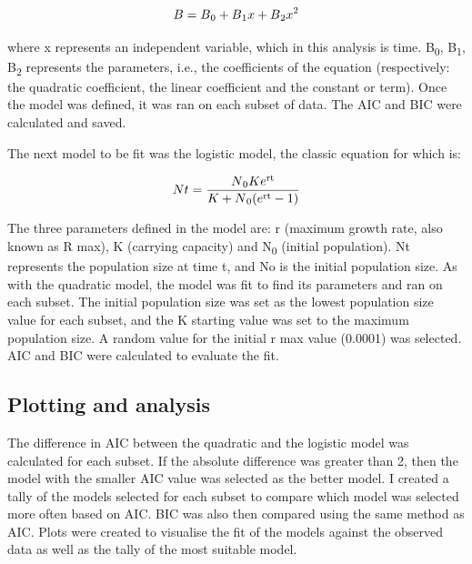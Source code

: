 \documentclass{article}[11pt]
\begin{document}
\begin{flushleft}
\[B = B\textsubscript{0}+B\textsubscript{1}x+B\textsubscript{2}x\textsuperscript{2}\]

where x represents an independent variable, which in this analysis is time. B\textsubscript{0}, B\textsubscript{1}, B\textsubscript{2} represents the parameters, i.e., the coefficients of the equation (respectively: the quadratic coefficient, the linear coefficient and the constant or term). Once the model was defined, it was ran on each subset of data. The AIC and BIC were calculated and saved.
\linebreak

The next model to be fit was the logistic model, the classic  equation for which is:

\[Nt = \frac{N\textsubscript{0} K e\textsuperscript{rt}}{K + N\textsubscript{0} (e\textsuperscript{rt} - 1)}\]

The three parameters defined in the model are: r (maximum growth rate, also known as R max), K (carrying capacity) and N\textsubscript{0} (initial population). Nt represents the population size at time t, and No is the initial population size. As with the quadratic model, the model was fit to find its parameters and ran on each subset. The initial population size was set as the lowest population size value for each subset, and the K starting value was set to the maximum population size. A random value for the initial r max value (0.0001) was selected. AIC and BIC were calculated to evaluate the fit.

\subsection{Plotting and analysis}

The difference in AIC between the quadratic and the logistic model was calculated for each subset. If the absolute difference was greater than 2, then the model with the smaller AIC value was selected as the better model. I created a tally of the models selected for each subset to compare which model was selected more often based on AIC. BIC was also then compared using the same method as AIC. Plots were created to visualise the fit of the models against the observed data as well as the tally of the most suitable model.


\end{flushleft}
\end{document}
